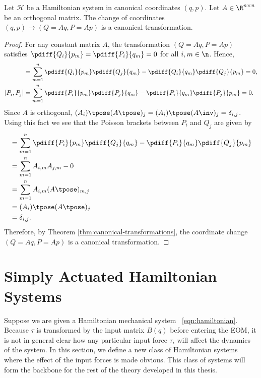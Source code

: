 \begin{lemma}\label{lemma:linear-is-canonical}
    Let \(\mathcal{H}\) be a Hamiltonian system in canonical coordinates
    \((q,p)\).
    Let \(A \in \R^{n\times n}\) be an orthogonal matrix.
    The change of coordinates \((q,p) \to (Q = Aq, P = Ap)\) is a canonical
    transformation.
\end{lemma}
\begin{proof}
    For any constant matrix \(A\), the transformation
    \((Q = Aq, P = Ap)\) satisfies
    \(\pdiff{Q_i}{p_m} = \pdiff{P_i}{q_m} = 0\) for all 
    \(i,m \in \n\).
    Hence, 
    \begin{align*}
        [Q_i,Q_j] &= \sum\limits_{m = 1}^n \pdiff{Q_i}{p_m}\pdiff{Q_j}{q_m} - 
        \pdiff{Q_i}{q_m}\pdiff{Q_j}{p_m} = 0
        , \\
        [P_i,P_j] &= \sum\limits_{m=1}^n \pdiff{P_i}{p_m}\pdiff{P_j}{q_m} -
        \pdiff{P_i}{q_m}\pdiff{P_j}{p_m} = 0
        .
    \end{align*}
    Since \(A\) is orthogonal, 
    \((A_i)\tpose (A\tpose)_j = (A_i)\tpose (A\inv)_j = \delta_{i,j}\). 
    Using this fact we see that the Poisson brackets between \(P_i\) and \(Q_j\)
    are given by
    \begin{align*}
        [P_i,Q_j] &= \sum\limits_{m=1}^n\pdiff{P_i}{p_m}\pdiff{Q_j}{q_m}
        - \pdiff{P_i}{q_m}\pdiff{Q_j}{p_m} \\
                  &= \sum\limits_{m=1}^n A_{i,m}A_{j,m} - 0 \\
                  &= \sum\limits_{m=1}^n A_{i,m}(A\tpose)_{m,j} \\
                  &= (A_i)\tpose (A\tpose)_j \\
                  &= \delta_{i,j}
        .
    \end{align*}
    Therefore, by Theorem \ref{thm:canonical-transformations}, the coordinate
    change \((Q = Aq, P = Ap)\) is a canonical transformation.
\end{proof}

\section{Simply Actuated Hamiltonian Systems}\label{sec:simply-actuated}
Suppose we are given a Hamiltonian mechanical system ~\eqref{eqn:hamiltonian}.
Because \(\tau\) is transformed by the input matrix \(B(q)\) before
entering the EOM, it is not in general clear how any particular input force \(\tau_i\)
will affect the dynamics of the system. 
In this section, we define a new class of Hamiltonian systems where the effect
of the input forces is made obvious. This class of
systems will form the backbone for the rest of the theory developed in this
thesis.

